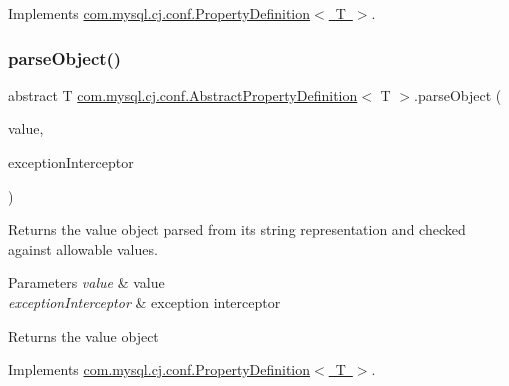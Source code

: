 Implements \mbox{\hyperlink{interfacecom_1_1mysql_1_1cj_1_1conf_1_1_property_definition_a72d0e665c12ca2bfa7c2fd6cf7d50656}{com.\+mysql.\+cj.\+conf.\+Property\+Definition$<$ T $>$}}.

\mbox{\label{classcom_1_1mysql_1_1cj_1_1conf_1_1_abstract_property_definition_aa8a990e4882d80051332cacda3886747}} 
\subsubsection{\texorpdfstring{parse\+Object()}{parseObject()}}
{\footnotesize\ttfamily abstract T \mbox{\hyperlink{classcom_1_1mysql_1_1cj_1_1conf_1_1_abstract_property_definition}{com.\+mysql.\+cj.\+conf.\+Abstract\+Property\+Definition}}$<$ T $>$.parse\+Object (\begin{DoxyParamCaption}\item[{String}]{value,  }\item[{\mbox{\hyperlink{interfacecom_1_1mysql_1_1cj_1_1exceptions_1_1_exception_interceptor}{Exception\+Interceptor}}}]{exception\+Interceptor }\end{DoxyParamCaption})\hspace{0.3cm}{\ttfamily [abstract]}}

Returns the value object parsed from it\textquotesingle{}s string representation and checked against allowable values.


\begin{DoxyParams}{Parameters}
{\em value} & value \\
\hline
{\em exception\+Interceptor} & exception interceptor\\
\hline
\end{DoxyParams}
\begin{DoxyReturn}{Returns}
the value object 
\end{DoxyReturn}


Implements \mbox{\hyperlink{interfacecom_1_1mysql_1_1cj_1_1conf_1_1_property_definition_a6abfb25b6102c876eddc4f10aca5687c}{com.\+mysql.\+cj.\+conf.\+Property\+Definition$<$ T $>$}}.

\mbox{\label{classcom_1_1mysql_1_1cj_1_1conf_1_1_abstract_property_definition_ae03fd77dd1ceb3cab75d1306509d277f}} 
